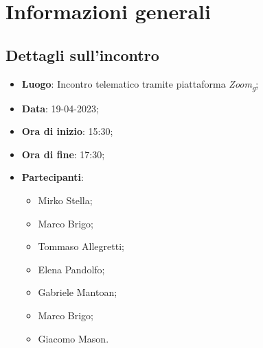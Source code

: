 \section{Informazioni generali}

\subsection{Dettagli sull'incontro}
\begin{itemize}
\item \textbf{Luogo}: Incontro telematico tramite piattaforma \textit{Zoom\textsubscript{g}};
\item \textbf{Data}: 19-04-2023;
\item \textbf{Ora di inizio}: 15:30;
\item \textbf{Ora di fine}: 17:30;
\item \textbf{Partecipanti}: 
\begin{itemize}
	\item Mirko Stella;
	\item Marco Brigo;
	\item Tommaso Allegretti;
	\item Elena Pandolfo;
	\item Gabriele Mantoan;
	\item Marco Brigo;
	\item Giacomo Mason.
\end{itemize}
\end{itemize}